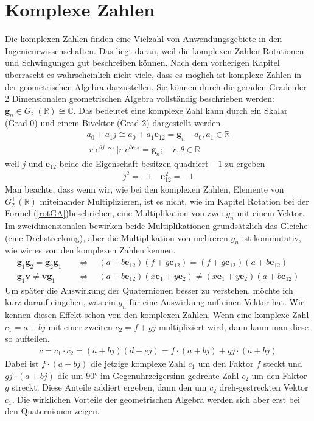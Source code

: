 %
%
%
\section{Komplexe Zahlen}

Die komplexen Zahlen finden eine Vielzahl von Anwendungsgebiete in den Ingenieurwissenschaften. Das liegt daran, weil die komplexen Zahlen Rotationen und Schwingungen gut beschreiben können. Nach dem vorherigen Kapitel überrascht es wahrscheinlich nicht viele, dass es möglich ist komplexe Zahlen in der geometrischen Algebra darzustellen. Sie können durch die geraden Grade der 2 Dimensionalen geometrischen Algebra vollständig beschrieben werden: $\mathbf{g}_n \in G_2^+(\mathbb{R}) \cong \mathbb{C}$. Das bedeutet eine komplexe Zahl kann durch ein Skalar (Grad 0) und einem Bivektor (Grad 2) dargestellt werden
\begin{align}
	a_0 + a_1 j \cong a_0 + a_1 \mathbf{e}_{12} = \mathbf{g}_n\quad a_0, a_1 \in \mathbb{R}\\
	|r|e^{\theta j} \cong |r|e^{\theta \mathbf{e}_{12}} = \mathbf{g}_n; \quad r, \theta \in \mathbb{R}
\end{align}
weil $j$ und $\mathbf{e}_{12}$ beide die Eigenschaft besitzen quadriert $-1$ zu ergeben
\begin{align}
	j^2 = -1\quad \mathbf{e}_{12}^2 = -1
\end{align}
Man beachte, dass wenn wir, wie bei den komplexen Zahlen, Elemente von $G_2^+(\mathbb{R})$ miteinander Multiplizieren, ist es nicht, wie im Kapitel Rotation bei der Formel (\ref{rotGA})beschrieben, eine Multiplikation von zwei $g_n$ mit einem Vektor. Im zweidimensionalen bewirken beide Multiplikationen grundsätzlich das Gleiche (eine Drehstreckung), aber die Multiplikation von mehreren $g_n$ ist kommutativ, wie wir es von den komplexen Zahlen kennen.
\begin{align}
	\mathbf{g}_1\mathbf{g}_2 = \mathbf{g}_2\mathbf{g}_1 \quad&\Leftrightarrow\quad (a + b \mathbf{e}_{12})(f + g \mathbf{e}_{12}) = (f + g \mathbf{e}_{12})(a + b \mathbf{e}_{12})\\
	\mathbf{g}_1\mathbf{v}\not= \mathbf{v}\mathbf{g}_1 \quad&\Leftrightarrow\quad(a + b \mathbf{e}_{12})(x\mathbf{e}_1+y\mathbf{e}_2)\not= (x\mathbf{e}_1+y\mathbf{e}_2)(a + b \mathbf{e}_{12})
\end{align}
Um später die Auswirkung der Quaternionen besser zu verstehen, möchte ich kurz darauf eingehen, was ein $g_n$ für eine Auswirkung auf einen Vektor hat.
Wir kennen diesen Effekt schon von den komplexen Zahlen. Wenn eine komplexe Zahl $c_1=a+bj$ mit einer zweiten $c_2=f+gj$ multipliziert wird, dann kann man diese so aufteilen.
\begin{align}
	c = c_1\cdot c_2 = (a + bj)(d + ej) = f\cdot(a+bj) + gj\cdot(a+bj)
\end{align}
Dabei ist $f\cdot(a+bj)$ die jetzige komplexe Zahl $c_1$ um den Faktor $f$ steckt und $gj\cdot(a+bj)$ die um 90° im Gegenuhrzeigersinn gedrehte Zahl $c_2$ um den Faktor $g$ streckt. Diese Anteile addiert ergeben, dann den um $c_2$ dreh-gestreckten Vektor $c_1$. Die wirklichen Vorteile der geometrischen Algebra werden sich aber erst bei den Quaternionen zeigen.
